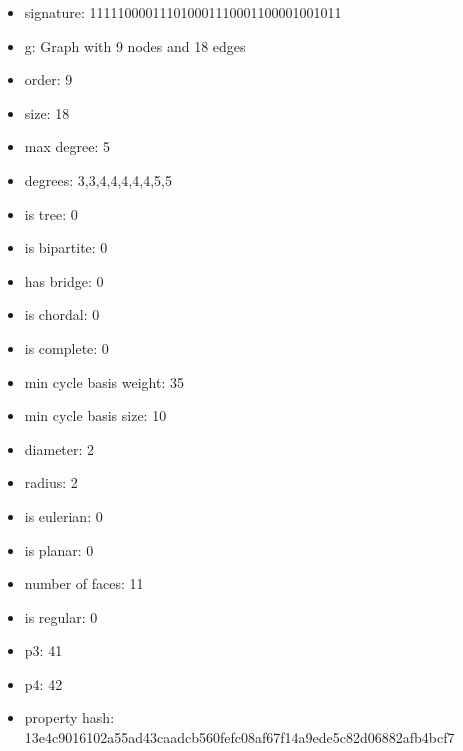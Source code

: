 \newpage
\begin{figure}
\end{figure}
\begin{itemize}
\item signature: 111110000111010001110001100001001011
\item g: Graph with 9 nodes and 18 edges
\item order: 9
\item size: 18
\item max degree: 5
\item degrees: 3,3,4,4,4,4,4,5,5
\item is tree: 0
\item is bipartite: 0
\item has bridge: 0
\item is chordal: 0
\item is complete: 0
\item min cycle basis weight: 35
\item min cycle basis size: 10
\item diameter: 2
\item radius: 2
\item is eulerian: 0
\item is planar: 0
\item number of faces: 11
\item is regular: 0
\item p3: 41
\item p4: 42
\item property hash: 13e4c9016102a55ad43caadcb560fefc08af67f14a9ede5c82d06882afb4bcf7
\end{itemize}
